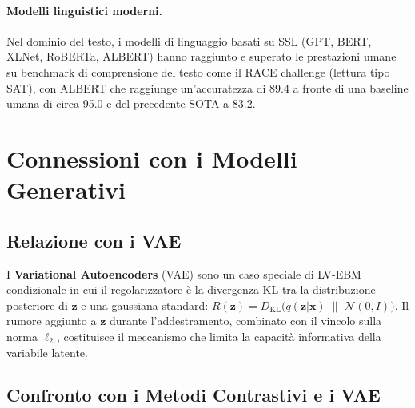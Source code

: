 \paragraph{Modelli linguistici moderni.}
Nel dominio del testo, i modelli di linguaggio basati su SSL (GPT, BERT,
XLNet, RoBERTa, ALBERT) hanno raggiunto e superato le prestazioni umane
su benchmark di comprensione del testo come il RACE challenge (lettura
tipo SAT), con ALBERT che raggiunge un'accuratezza di 89.4 a fronte di
una baseline umana di circa 95.0 e del precedente SOTA a 83.2.

\section{Connessioni con i Modelli Generativi}
\label{sec:ebm-generative}

\subsection{Relazione con i VAE}
\label{subsec:ebm-vae}

I \textbf{Variational Autoencoders} (VAE) sono un caso speciale di
LV-EBM condizionale in cui il regolarizzatore è la divergenza KL tra la
distribuzione posteriore di $\mathbf{z}$ e una gaussiana standard:
$R(\mathbf{z}) = D_\mathrm{KL}\!\bigl(q(\mathbf{z}|\mathbf{x})
\;\|\; \mathcal{N}(0,I)\bigr)$.
Il rumore aggiunto a $\mathbf{z}$ durante l'addestramento, combinato con
il vincolo sulla norma $\ell_2$, costituisce il meccanismo che limita la
capacità informativa della variabile latente.

\subsection{Confronto con i Metodi Contrastivi e i VAE}
\label{subsec:cd-vs-vae}

